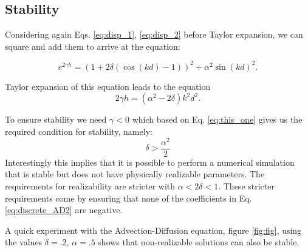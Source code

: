 \documentclass[]{article}
\begin{document}
\subsection{Stability}
Considering again Eqs. \ref{eq:disp_1}, \ref{eq:disp_2} before Taylor expansion, we can square and add them to arrive at the equation:

\begin{equation}
e^{2\gamma h} = (1+2\delta(\cos(kd)-1))^2 + \alpha^2\sin(kd)^2.
\end{equation}

Taylor expansion of this equation leads to the equation
\begin{equation}
2\gamma h = (\alpha^2 - 2\delta)k^2d^2.
\label{eq:this_one}
\end{equation}

To ensure stability we need $\gamma <0$ which based on Eq. \ref{eq:this_one} gives us the required condition for stability, namely:
\begin{equation}
\delta > \frac{\alpha^2}{2}
\end{equation}
Interestingly this implies that it is possible to perform a numerical simulation that is stable but does not have physically realizable parameters. The requirements for realizability are stricter with $\alpha < 2\delta < 1$. These stricter requirements come by ensuring that none of the coefficients in Eq. \ref{eq:discrete_AD2} are negative.


A quick experiment with the Advection-Diffusion equation, figure \ref{fig:fig}, using the values $\delta = .2$, $\alpha = .5$ shows that non-realizable solutions can also be stable. 
\end{document}
